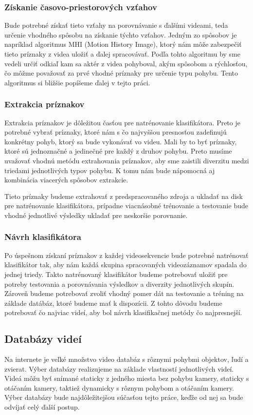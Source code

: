 \subsubsection{Získanie časovo-priestorových vzťahov}
Bude potrebné získať tieto vzťahy na porovnávanie s ďalšími videami, teda určenie vhodného spôsobu na získanie týchto vzťahov. Jedným zo spôsobov je napríklad algoritmus MHI (Motion History Image), ktorý nám môže zabezpečiť tieto príznaky z videa uložiť a ďalej spracovávať. Podľa tohto algoritmu by sme vedeli určiť odkiaľ kam sa aktér z videa pohyboval, akým spôsobom a rýchlosťou, čo môžme považovať za prvé vhodné príznaky pre určenie typu pohybu.\cite{c3} Tento algoritmus si bližšie popíšeme ďalej v tejto práci.

\subsubsection{Extrakcia príznakov}
Extrakcia príznakov je dôležitou časťou pre natrénovanie klasifikátora. Preto je potrebné vybrať príznaky, ktoré nám s čo najvyššou presnosťou zadefinujú konkrétny pohyb, ktorý sa bude vykonávať vo videu. Mali by to byť príznaky, ktoré sú jednoznačné a jedinečné pre každý z druhov pohybu. Preto musíme uvažovať vhodnú metódu extrahovania príznakov, aby sme zaistili diverzitu medzi triedami jednotlivých typov pohybu. K tomu nám bude nápomocná aj kombinácia viacerých spôsobov extrakcie. 

Tieto príznaky budeme extrahovať z predspracovaného zdroja a ukladať na disk pre natrénovanie klasifikátora, prípadne viacnásobné trénovanie a testovanie bude vhodné jednotlivé výsledky ukladať pre neskoršie porovnanie.

\subsubsection{Návrh klasifikátora}
Po úspešnom získaní príznakov z každej videosekvencie bude potrebné natrénovať klasifikátor tak, aby nám každá skupina spracovaných videozáznamov spadala do jednej triedy. Takto natrénovaný klasifikátor budeme potrebovať uložiť pre potreby testovania a porovnávania výsledkov a diverzity jednotlivých skupín. Zároveň budeme potrebovať zvoliť vhodný pomer dát na testovanie a tréning na základe datábáz, ktoré budeme mať k dispozícii. Z tohto dôvodu budeme potrebovať čo najviac videí, aby bol návrh klasifikačnej metódy čo najpresnejší.


\subsection{Databázy videí}
Na internete je veľké množstvo video databáz s rôznymi pohybmi objektov, ľudí a zvierat.
Výber databázy realizujeme na základe vlastností jednotlivých videí. Videá môžu byť snímané staticky z jedného miesta bez pohybu kamery, staticky s otáčaním kamery, taktiež dynamicky s rôznym pohybom a otáčaním kamery. Výber databázy bude najdôležitejšou súčasťou tejto práce, keďže od nej sa bude odvíjať celý ďalší postup.
